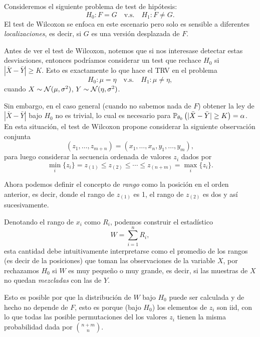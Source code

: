 Consideremos el siguiente problema de test de hipótesis: 
	\begin{equation}
		H_0:F=G\quad \text{v.s.}\quad H_1:F\neq G.
	\end{equation}
El test de Wilcoxon se enfoca en este escenario pero solo es sensible a diferentes \emph{localizaciones}, es decir, si $G$ es una versión desplazada de $F$.

Antes de ver el test de Wilcoxon, notemos que si nos interesase detectar estas desviaciones, entonces podríamos considerar un test que rechace $H_0$ si $|\bar{X} - \bar{Y}|\geq K$. Esto  es exactamente lo que hace el TRV en el problema 
	\begin{equation}
		H_0:\mu =  \eta \quad \text{v.s.}\quad H_1:\mu\neq \eta,
	\end{equation}
cuando $X\sim{\mathcal N}(\mu,\sigma^2)$,  $Y\sim{\mathcal N}(\eta,\sigma^2)$.

Sin embargo, en el caso general (cuando no sabemos nada de $F$) obtener la ley de $|\bar{X} - \bar{Y}|$ bajo $H_0$ no es trivial, lo cual es necesario para $\mathbb{P}_{\theta_0} \left(|\bar{X} - \bar{Y}|\geq K\right) = \alpha$. En esta situación, el test de Wilcoxon propone considerar la siguiente observación conjunta 
\begin{equation}
	(z_1,\ldots,z_{m+n}) = (x_1,\ldots,x_n,y_1,\ldots,y_m),
\end{equation}
para luego considerar la secuencia ordenada de valores $z_i$ dados por 
\begin{equation}
	\min_i\{z_i\} = z_{(1)}\leq z_{(2)}\leq\cdots\leq z_{(n+m)} = \max_i\{z_i\}.
\end{equation}

Ahora podemos definir el concepto de \emph{rango} como la posición en el orden anterior, es decir, donde el rango de $z_{(1)}$ es 1, el rango de $z_{(2)}$ es dos  y así sucesivamente. 


Denotando el rango de $x_i$ como $R_i$, podemos construir el estadístico
\begin{equation}
 	W = \sum_{i=1}^{n}R_i,
 \end{equation} 
esta cantidad debe intuitivamente interpretarse como el promedio de los rangos (es decir de la posiciones) que toman las observaciones de la variable $X$, por rechazamos $H_0$ si $W$ es muy pequeño o muy grande, es decir, si las muestras de $X$ no quedan \emph{mezcladas} con las de $Y$. 

 Esto es posible por que la distribución de $W$ bajo $H_0$ puede ser calculada y de hecho no depende de $F$, esto es porque (bajo $H_0$) los elementos de $z_i$ son iid, con lo que todas las posible permutaciones del los valores $z_i$ tienen la misma probabilidad dada por $\binom{n+m}{n}$.


